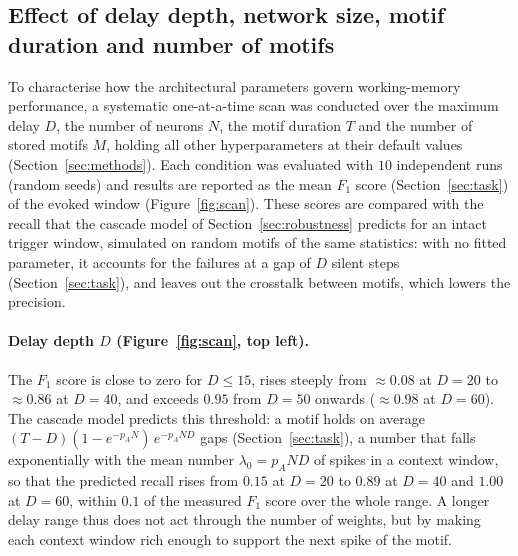 \documentclass{scrartcl}
\begin{document}
\subsection{Effect of delay depth, network size, motif duration and number of motifs}
To characterise how the architectural parameters govern working-memory performance, a systematic one-at-a-time scan was conducted over the maximum delay $D$, the number of neurons $N$, the motif duration $T$ and the number of stored motifs $M$, holding all other hyperparameters at their default values (Section~\ref{sec:methods}). Each condition was evaluated with $10$ independent runs (random seeds) and results are reported as the mean $F_1$ score (Section~\ref{sec:task}) of the evoked window (Figure~\ref{fig:scan}). These scores are compared with the recall that the cascade model of Section~\ref{sec:robustness} predicts for an intact trigger window, simulated on random motifs of the same statistics: with no fitted parameter, it accounts for the failures at a gap of $D$ silent steps (Section~\ref{sec:task}), and leaves out the crosstalk between motifs, which lowers the precision.


\paragraph{Delay depth $D$ (Figure~\ref{fig:scan}, top left).}
The $F_1$ score is close to zero for $D \leq 15$, rises steeply from $\approx 0.08$ at $D = 20$ to $\approx 0.86$ at $D = 40$, and exceeds $0.95$ from $D = 50$ onwards ($\approx 0.98$ at $D = 60$). The cascade model predicts this threshold: a motif holds on average $(T-D)(1 - e^{-p_A N})\, e^{-p_A N D}$ gaps (Section~\ref{sec:task}), a number that falls exponentially with the mean number $\lambda_0 = p_A N D$ of spikes in a context window, so that the predicted recall rises from $0.15$ at $D = 20$ to $0.89$ at $D = 40$ and $1.00$ at $D = 60$, within $0.1$ of the measured $F_1$ score over the whole range. A longer delay range thus does not act through the number of weights, but by making each context window rich enough to support the next spike of the motif.
\end{document}
